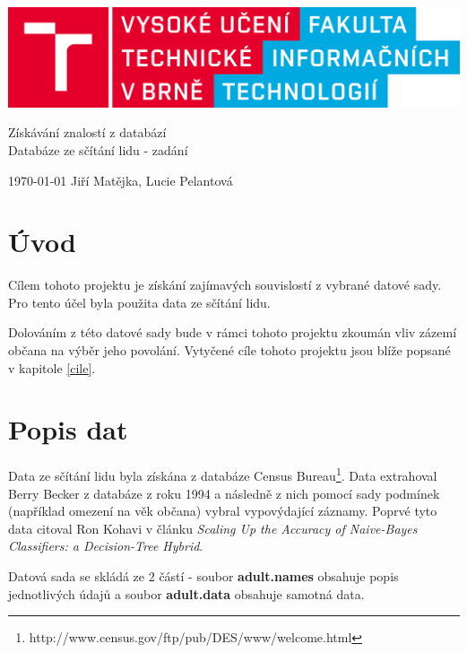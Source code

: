 \documentclass[11pt,a4paper,titlepage]{article}
\begin{document}
		\begin{center}

			\includegraphics[width = 150mm]{img/logo.png}\\


			\LARGE
			Získávání znalostí z databází\\
			Databáze ze sčítání lidu - zadání\\

		\end{center}

	\Large{\today} \hfill Jiří Matějka, Lucie Pelantová
	\thispagestyle{empty}
	\newpage
	\setcounter{page}{1}

    \section{Úvod}
        Cílem tohoto projektu je získání zajímavých souvislostí z vybrané datové sady. Pro tento účel byla použita data ze sčítání lidu.
        
        Dolováním z této datové sady bude v rámci tohoto projektu zkoumán vliv zázemí občana na výběr jeho povolání. Vytyčené cíle tohoto projektu jsou blíže popsané v kapitole \ref{cile}.
    
    \section{Popis dat}
    Data ze sčítání lidu byla získána z databáze Census Bureau\footnote{http://www.census.gov/ftp/pub/DES/www/welcome.html}. Data extrahoval Berry Becker z databáze z roku 1994 a následně z nich pomocí sady podmínek (například omezení na věk občana)  vybral vypovýdající záznamy. Poprvé tyto data citoval Ron Kohavi v článku \textit{Scaling Up the Accuracy of Naive-Bayes Classifiers: a Decision-Tree Hybrid}.
    
        Datová sada se skládá ze 2 částí - soubor \textbf{adult.names} obsahuje popis jednotlivých údajů a soubor \textbf{adult.data} obsahuje samotná data.
    
\end{document}
